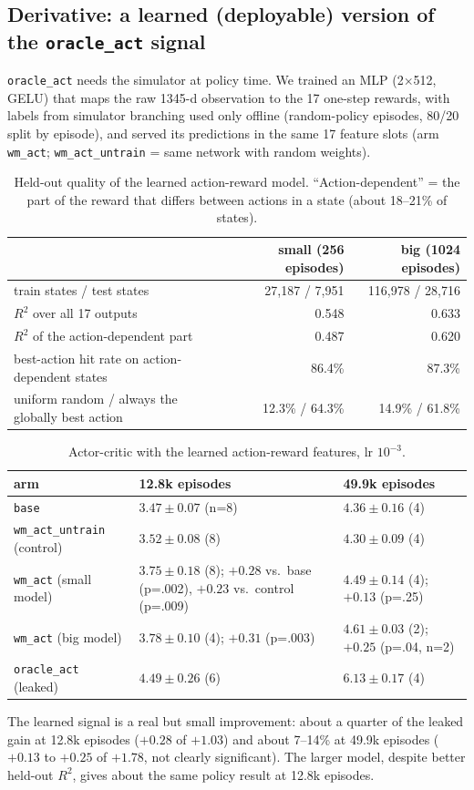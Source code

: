 \documentclass[11pt]{article}
\begin{document}
\subsection{Derivative: a learned (deployable) version of the \texttt{oracle\_act} signal}
\texttt{oracle\_act} needs the simulator at policy time. We trained an MLP (2$\times$512, GELU) that maps the raw 1345-d observation to the 17 one-step rewards, with labels from simulator branching used only offline (random-policy episodes, 80/20 split by episode), and served its predictions in the same 17 feature slots (arm \texttt{wm\_act}; \texttt{wm\_act\_untrain} = same network with random weights).
\begin{table}[h]
\centering\small
\caption{Held-out quality of the learned action-reward model. ``Action-dependent'' = the part of the reward that differs between actions in a state (about 18--21\% of states).}
\begin{tabular}{lrr}
\toprule
& small (256 episodes) & big (1024 episodes) \\
\midrule
train states / test states & 27{,}187 / 7{,}951 & 116{,}978 / 28{,}716 \\
$R^2$ over all 17 outputs & 0.548 & 0.633 \\
$R^2$ of the action-dependent part & 0.487 & 0.620 \\
best-action hit rate on action-dependent states & 86.4\% & 87.3\% \\
\quad uniform random / always the globally best action & 12.3\% / 64.3\% & 14.9\% / 61.8\% \\
\bottomrule
\end{tabular}
\end{table}

\begin{table}[h]
\centering\small
\caption{Actor-critic with the learned action-reward features, lr $10^{-3}$.}
\begin{tabular}{lp{5.2cm}p{5.2cm}}
\toprule
arm & 12.8k episodes & 49.9k episodes \\
\midrule
\texttt{base} & $3.47\pm0.07$ (n=8) & $4.36\pm0.16$ (4) \\
\texttt{wm\_act\_untrain} (control) & $3.52\pm0.08$ (8) & $4.30\pm0.09$ (4) \\
\texttt{wm\_act} (small model) & $\mathbf{3.75\pm0.18}$ (8); $+0.28$ vs.\ base (p=.002), $+0.23$ vs.\ control (p=.009) & $4.49\pm0.14$ (4); $+0.13$ (p=.25) \\
\texttt{wm\_act} (big model) & $3.78\pm0.10$ (4); $+0.31$ (p=.003) & $4.61\pm0.03$ (2); $+0.25$ (p=.04, n=2) \\
\texttt{oracle\_act} (leaked) & $4.49\pm0.26$ (6) & $6.13\pm0.17$ (4) \\
\bottomrule
\end{tabular}
\end{table}
The learned signal is a real but small improvement: about a quarter of the leaked gain at 12.8k episodes ($+0.28$ of $+1.03$) and about 7--14\% at 49.9k episodes ($+0.13$ to $+0.25$ of $+1.78$, not clearly significant). The larger model, despite better held-out $R^2$, gives about the same policy result at 12.8k episodes.
\end{document}
